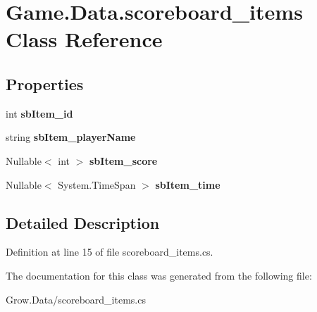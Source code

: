 \hypertarget{class_game_1_1_data_1_1scoreboard__items}{}\section{Game.\+Data.\+scoreboard\+\_\+items Class Reference}
\label{class_game_1_1_data_1_1scoreboard__items}
\subsection*{Properties}
\begin{DoxyCompactItemize}
\item 
\mbox{\label{class_game_1_1_data_1_1scoreboard__items_a77390aca83ddce20b47f2d82a891ba19}} 
int {\bfseries sb\+Item\+\_\+id}
\item 
\mbox{\label{class_game_1_1_data_1_1scoreboard__items_ab23e36e07719faaa72863b360b5f4041}} 
string {\bfseries sb\+Item\+\_\+player\+Name}
\item 
\mbox{\label{class_game_1_1_data_1_1scoreboard__items_abe189e73c0914ba86c10b29b6887f0a5}} 
Nullable$<$ int $>$ {\bfseries sb\+Item\+\_\+score}
\item 
\mbox{\label{class_game_1_1_data_1_1scoreboard__items_ab31bac7a348a9c968b1cc70b863ce7cf}} 
Nullable$<$ System.\+Time\+Span $>$ {\bfseries sb\+Item\+\_\+time}
\end{DoxyCompactItemize}


\subsection{Detailed Description}


Definition at line 15 of file scoreboard\+\_\+items.\+cs.



The documentation for this class was generated from the following file\+:\begin{DoxyCompactItemize}
\item 
Grow.\+Data/scoreboard\+\_\+items.\+cs\end{DoxyCompactItemize}

